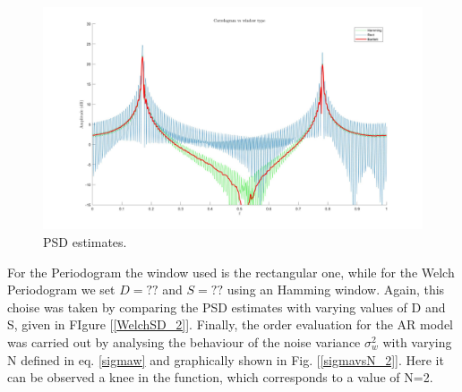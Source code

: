 \documentclass[a4paper,11pt,openright,twoside]{report}
\begin{document}
\begin{figure}
	\centering
	\includegraphics[width=14cm]{images/Corr_vs_window.jpg}
	\caption{PSD estimates.}\label{Welch_2} 
\end{figure}

For the Periodogram the window used is the rectangular one, while for the Welch Periodogram we set $D=??$ and $S=??$ using an Hamming window. Again, this choise was taken by comparing the PSD estimates with varying values of D and S, given in FIgure [\ref{WelchSD_2}]. Finally, the order evaluation for the AR model was carried out by analysing the behaviour of the noise variance $\sigma_w^2$ with varying N defined in eq. \ref{sigmaw} and graphically shown in Fig. [\ref{sigmavsN_2}]. Here it can be observed a knee in the function, which corresponds to a value of N=2.
\end{document}
